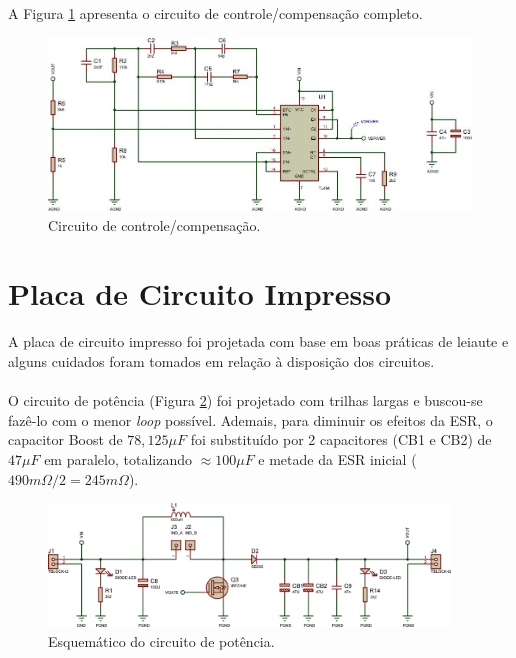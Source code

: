 \documentclass[a4paper]{article}
\begin{document}
{A Figura \ref{fig:sch-controle} apresenta o circuito de controle/compensação completo.

\begin{figure}[H]
	\centering
	\includegraphics[width=1.0\textwidth]{sch-controle.jpg}
	\caption{Circuito de controle/compensação.}
	\label{fig:sch-controle}
\end{figure}


\clearpage

\section{Placa de Circuito Impresso}

A placa de circuito impresso foi projetada com base em boas práticas de leiaute e alguns cuidados foram tomados em relação à disposição dos circuitos.
\\
\\
O circuito de potência (Figura \ref{fig:sch-pot}) foi projetado com trilhas largas e buscou-se fazê-lo com o menor \emph{loop} possível. Ademais, para diminuir os efeitos da ESR, o capacitor Boost de $78,125\mu F$ foi substituído por 2 capacitores (CB1 e CB2) de $47\mu F$ em paralelo, totalizando $\approx100\mu F$ e metade da ESR inicial ($490 m\Omega/2=245m\Omega$).

\begin{figure}[H]
	\centering
	\includegraphics[width=0.95\textwidth]{sch-potencia.jpg}
	\caption{Esquemático do circuito de potência.}
	\label{fig:sch-pot}
\end{figure}

}
\end{document}
